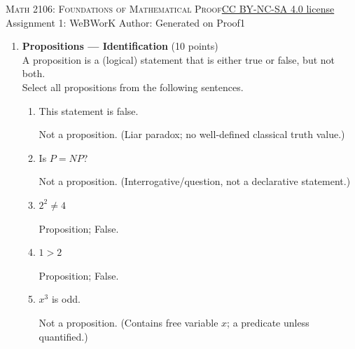 \newpage\handout
{\textsc{Math 2106: Foundations of Mathematical Proof}}{\href{https://creativecommons.org/licenses/by-nc-sa/4.0/}{CC BY-NC-SA 4.0 license}}
{Assignment 1: WeBWorK}
{Author: \href{\HandoutAuthorUrl}{\HandoutAuthor}}{Generated on \generatedOn}
{Proof1}

\newpage






\newpage





\begin{enumerate}


  \item \textbf{Propositions --- Identification} (10 points)\\
  A proposition is a (logical) statement that is either true or false, but not both.\\
  Select all propositions from the following sentences.
  \begin{enumerate}[label=\Alph*.]
    \item This statement is false.\\
    \begin{subanswer}
      Not a proposition. (Liar paradox; no well-defined classical truth value.)
    \end{subanswer}

    \item Is $P=NP$?\\
    \begin{subanswer}
      Not a proposition. (Interrogative/question, not a declarative statement.)
    \end{subanswer}

    \item $2^2 \neq 4$\\
    \begin{subanswer}
      Proposition; False.
    \end{subanswer}

    \item $1>2$\\
    \begin{subanswer}
      Proposition; False.
    \end{subanswer}

    \item $x^3$ is odd.\\
    \begin{subanswer}
      Not a proposition. (Contains free variable $x$; a predicate unless quantified.)
    \end{subanswer}


\end{enumerate}
\end{enumerate}
